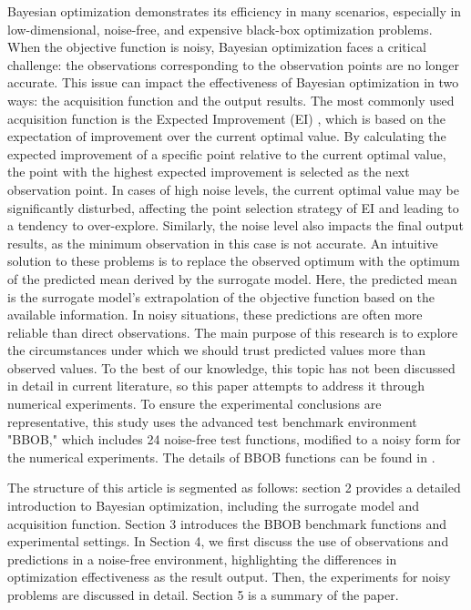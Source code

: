 \documentclass{article}
\begin{document}
\hspace{2em}
Bayesian optimization demonstrates its efficiency in many scenarios, especially in low-dimensional, noise-free, and expensive black-box optimization problems. When the objective function is noisy, Bayesian optimization faces a critical challenge: the observations corresponding to the observation points are no longer accurate. This issue can impact the effectiveness of Bayesian optimization in two ways: the acquisition function and the output results. The most commonly used acquisition function is the Expected Improvement (EI) \citep{Jones1998Efficient}, which is based on the expectation of improvement over the current optimal value. By calculating the expected improvement of a specific point relative to the current optimal value, the point with the highest expected improvement is selected as the next observation point. In cases of high noise levels, the current optimal value may be significantly disturbed, affecting the point selection strategy of EI and leading to a tendency to over-explore. Similarly, the noise level also impacts the final output results, as the minimum observation in this case is not accurate. An intuitive solution to these problems is to replace the observed optimum with the optimum of the predicted mean derived by the surrogate model. Here, the predicted mean is the surrogate model’s extrapolation of the objective function based on the available information. In noisy situations, these predictions are often more reliable than direct observations. The main purpose of this research is to explore the circumstances under which we should trust predicted values more than observed values. To the best of our knowledge, this topic has not been discussed in detail in current literature, so this paper attempts to address it through numerical experiments. To ensure the experimental conclusions are representative, this study uses the advanced test benchmark environment "BBOB," which includes 24 noise-free test functions, modified to a noisy form for the numerical experiments. The details of BBOB functions can be found in \citep{Hansen2010RealParameterBO}.

\hspace{2em}
The structure of this article is segmented as follows: section 2 provides a detailed introduction to Bayesian optimization, including the surrogate model and acquisition function. Section 3 introduces the BBOB benchmark functions and experimental settings. In Section 4, we first discuss the use of observations and predictions in a noise-free environment, highlighting the differences in optimization effectiveness as the result output. Then, the experiments for noisy problems are discussed in detail. Section 5 is a summary of the paper.
\end{document}
